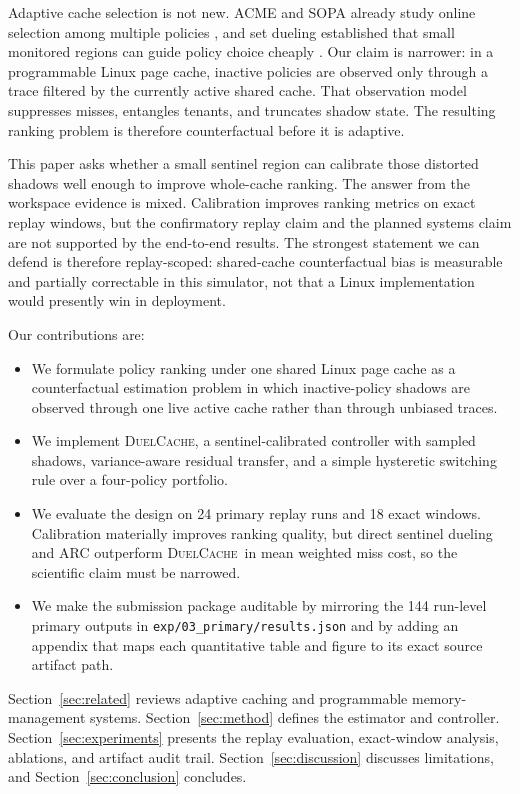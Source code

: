 \documentclass{article}
\newcommand{\duel}{\textsc{DuelCache}}
\begin{document}
Adaptive cache selection is not new. ACME and SOPA already study online selection among multiple policies \citep{ari2002acme,wang2010sopa}, and set dueling established that small monitored regions can guide policy choice cheaply \citep{qureshi2008set}. Our claim is narrower: in a programmable Linux page cache, inactive policies are observed only through a trace filtered by the currently active shared cache. That observation model suppresses misses, entangles tenants, and truncates shadow state. The resulting ranking problem is therefore counterfactual before it is adaptive.

This paper asks whether a small sentinel region can calibrate those distorted shadows well enough to improve whole-cache ranking. The answer from the workspace evidence is mixed. Calibration improves ranking metrics on exact replay windows, but the confirmatory replay claim and the planned systems claim are not supported by the end-to-end results. The strongest statement we can defend is therefore replay-scoped: shared-cache counterfactual bias is measurable and partially correctable in this simulator, not that a Linux implementation would presently win in deployment.

Our contributions are:
\begin{itemize}
\item We formulate policy ranking under one shared Linux page cache as a counterfactual estimation problem in which inactive-policy shadows are observed through one live active cache rather than through unbiased traces.
\item We implement \duel, a sentinel-calibrated controller with sampled shadows, variance-aware residual transfer, and a simple hysteretic switching rule over a four-policy portfolio.
\item We evaluate the design on 24 primary replay runs and 18 exact windows. Calibration materially improves ranking quality, but direct sentinel dueling and ARC outperform \duel\ in mean weighted miss cost, so the scientific claim must be narrowed.
\item We make the submission package auditable by mirroring the 144 run-level primary outputs in \texttt{exp/03\_primary/results.json} and by adding an appendix that maps each quantitative table and figure to its exact source artifact path.
\end{itemize}

Section~\ref{sec:related} reviews adaptive caching and programmable memory-management systems. Section~\ref{sec:method} defines the estimator and controller. Section~\ref{sec:experiments} presents the replay evaluation, exact-window analysis, ablations, and artifact audit trail. Section~\ref{sec:discussion} discusses limitations, and Section~\ref{sec:conclusion} concludes.
\end{document}
